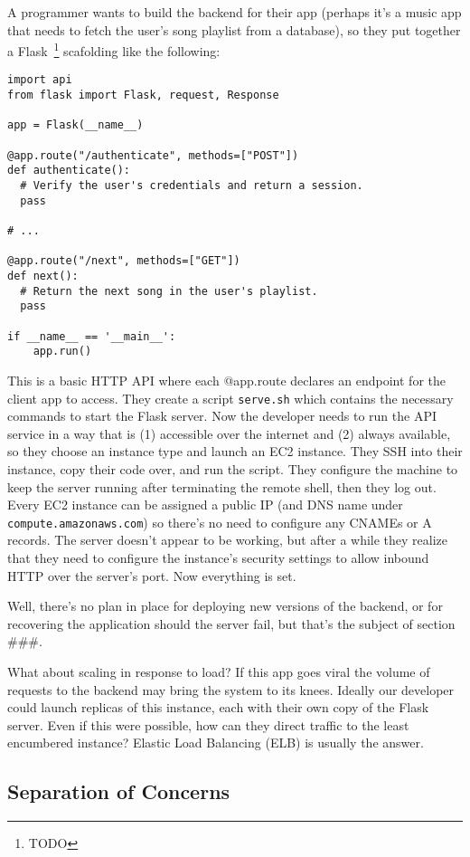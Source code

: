 \documentclass{article}
\newcommand{\newp}{\newline\indent}
\begin{document}
\newp A programmer wants to build the backend for their app (perhaps it's a music app that needs to fetch the user's song playlist from a database), so they put together a Flask~\footnote{TODO} scafolding like the following:

\begin{verbatim}
import api
from flask import Flask, request, Response

app = Flask(__name__)

@app.route("/authenticate", methods=["POST"])
def authenticate():
  # Verify the user's credentials and return a session.
  pass

# ...

@app.route("/next", methods=["GET"])
def next():
  # Return the next song in the user's playlist.
  pass

if __name__ == '__main__':
    app.run()
\end{verbatim}

This is a basic HTTP API where each @app.route declares an endpoint for the client app to access.
They create a script \texttt{serve.sh} which contains the necessary commands to start the Flask server.
Now the developer needs to run the API service in a way that is (1) accessible over the internet and (2) always available, so they choose an instance type and launch an EC2 instance.
They SSH into their instance, copy their code over, and run the script.
They configure the machine to keep the server running after terminating the remote shell, then they log out.
Every EC2 instance can be assigned a public IP (and DNS name under \texttt{compute.amazonaws.com}) so there's no need to configure any CNAMEs or A records.
The server doesn't appear to be working, but after a while they realize that they need to configure the instance's security settings to allow inbound HTTP over the server's port.
Now everything is set.

\newp Well, there's no plan in place for deploying new versions of the backend, or for recovering the application should the server fail, but that's the subject of section ###.

\newp What about scaling in response to load?
If this app goes viral the volume of requests to the backend may bring the system to its knees.
Ideally our developer could launch replicas of this instance, each with their own copy of the Flask server.
Even if this were possible, how can they direct traffic to the least encumbered instance?
Elastic Load Balancing (ELB) is usually the answer.

\subsection {Separation of Concerns}
\end{document}
